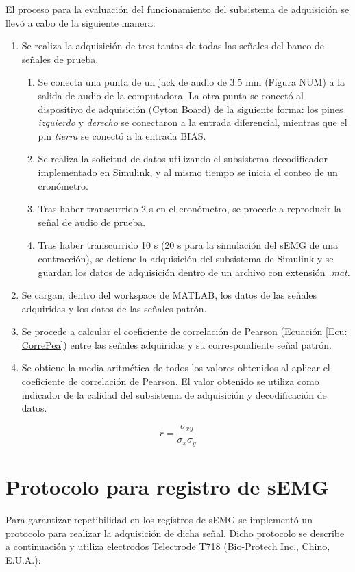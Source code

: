 \newpage
El proceso para la evaluación del funcionamiento del subsistema de adquisición se llevó a cabo de la siguiente manera:
\begin{enumerate}
	\item Se realiza la adquisición de tres tantos de todas las señales del banco de señales de prueba.
	\begin{enumerate}
		\item Se conecta una punta de un jack de audio de 3.5 mm (Figura NUM) a la salida de audio de la computadora. La otra punta se conectó al dispositivo de adquisición (Cyton Board) de la siguiente forma: los pines \emph{izquierdo} y \emph{derecho} se conectaron a la entrada diferencial, mientras que el pin \emph{tierra} se conectó a la entrada BIAS.
		\item Se realiza la solicitud de datos utilizando el subsistema decodificador implementado en Simulink, y al mismo tiempo se inicia el conteo de un cronómetro.
		\item Tras haber transcurrido 2 s en el cronómetro, se procede a reproducir la señal de audio de prueba.
		\item Tras haber transcurrido 10 s (20 s para la simulación del sEMG de una contracción), se detiene la adquisición del subsistema de Simulink y se guardan los datos de adquisición dentro de un archivo con extensión \emph{.mat}.
	\end{enumerate}
	\item Se cargan, dentro del workspace de MATLAB, los datos de las señales adquiridas y los datos de las señales patrón.
	\item Se procede a calcular el coeficiente de correlación de Pearson (Ecuación \ref{Ecu: CorrePea}) entre las señales adquiridas y su correspondiente señal patrón.
	\item Se obtiene la media aritmética de todos los valores obtenidos al aplicar el coeficiente de correlación de Pearson. El valor obtenido se utiliza como indicador de la calidad del subsistema de adquisición y decodificación de datos.
\end{enumerate}

\begin{equation}
	r = \frac{\sigma_{xy}}{\sigma_{x}\sigma_{y}}
	\label{Ecu: CorrePea}
\end{equation}


\newpage
\section{Protocolo para registro de sEMG}\label{Section: ProReg}
Para garantizar repetibilidad en los registros de sEMG se implementó un protocolo para realizar la adquisición de dicha señal. Dicho protocolo se describe a continuación y utiliza electrodos Telectrode T718 (Bio-Protech Inc., Chino, E.U.A.):

